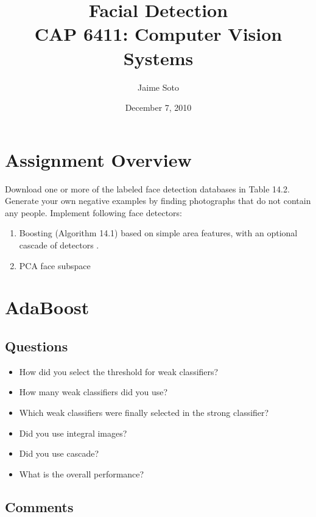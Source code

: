 \documentclass[10pt,letterpaper]{article}
\author{Jaime Soto}
\title{ Facial Detection \\
        CAP 6411: Computer Vision Systems}
\date{December 7, 2010}
\begin{document}
\maketitle

\tableofcontents



\newpage

\section{Assignment Overview}

Download one or more of the labeled face detection databases in Table 14.2. 
Generate your own negative examples by finding photographs that do not contain 
any people. Implement following face detectors:

\begin{enumerate}
\item Boosting (Algorithm 14.1) \cite{szeliski_2010} based on simple area 
features, with an optional cascade of detectors \cite{viola_jones_2004}.

\item PCA face subspace \cite{moghaddam_pentland_1997}
\end{enumerate}

\section{AdaBoost}

\subsection{Questions}

\begin{itemize}
    \item How did you select the threshold for weak classifiers?
    \item How many weak classifiers did you use?
    \item Which weak classifiers were finally selected in the strong classifier?
    \item Did you use integral images?
    \item Did you use cascade?
    \item What is the overall performance?
\end{itemize}

\subsection{Comments}
\end{document}
